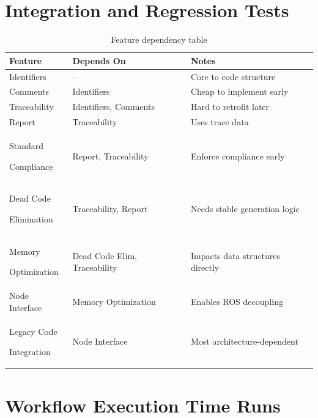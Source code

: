 \section{Integration and Regression Tests}
\label{app:int_and_reg_tests}


\bgroup
{}
\begin{xltabular}{\textwidth}{X X X}
	\caption{Feature dependency table}
	\label{tab:app_int_and_reg_tests}\\
	\toprule
	Feature & Depends On & Notes \\
	\midrule
	Identifiers & – & Core to code structure \\
	Comments & Identifiers & Cheap to implement early \\
	Traceability & Identifiers, Comments & Hard to retrofit later \\
	Report & Traceability & Uses trace data \\
	Standard\par Compliance & Report, Traceability & Enforce compliance early \\
	Dead Code\par Elimination & Traceability, Report & Needs stable generation logic \\
	Memory\par Optimization & Dead Code Elim, Traceability & Impacts data structures directly \\
	Node Interface & Memory Optimization & Enables \gls{ROS} decoupling \\
	Legacy Code\par Integration & Node Interface & Most architecture-dependent \\
	\bottomrule
\end{xltabular}


\section{Workflow Execution Time Runs}
\label{app:workflow_exec_time}


